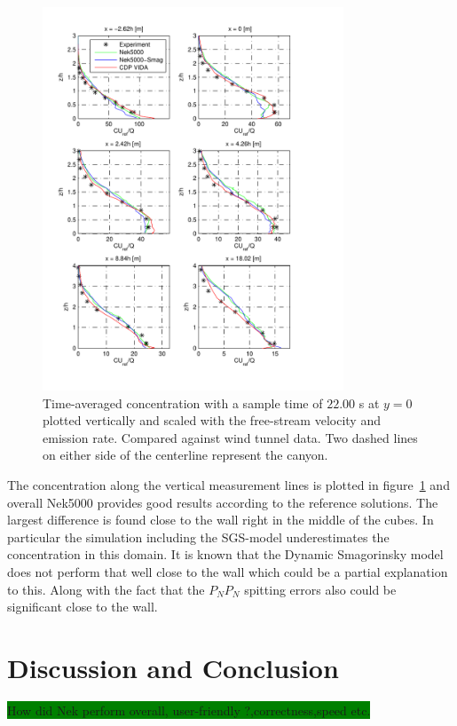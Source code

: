 \newpage
\begin{figure}[h]
    \centering
    \includegraphics[width=0.8\textwidth]{Figures/NekcV_all.pdf}
    \caption{Time-averaged concentration with a sample time of $22.00$ s at $y = 0$ plotted
    vertically and scaled 
    with the free-stream velocity and emission rate. Compared against wind tunnel data.
Two dashed lines on either side of the centerline represent the canyon.}
    \label{fig:cVall}
\end{figure}
The concentration along the vertical measurement lines is plotted in figure~\ref{fig:cVall} and overall 
Nek5000 provides good results according to the reference solutions. The largest difference is found close 
to the wall right in the middle of the cubes. In particular the simulation including the SGS-model 
underestimates the concentration in this domain. It is known that the Dynamic Smagorinsky model does not 
perform that well close to the wall which could be a partial explanation to this. Along with the fact that 
the $P_NP_N$ spitting errors also could be significant close to the wall.




\section{Discussion and Conclusion}
\colorbox{green}{How did Nek perform overall, user-friendly ?,correctness,speed etc.}

